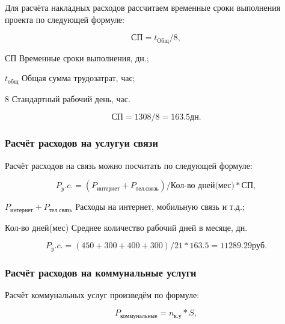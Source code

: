 Для расчёта накладных расходов рассчитаем временные сроки выполнения проекта по следующей
формуле:

\begin{equation}
    \text{СП} = t_\text{Общ} / 8,
\end{equation}

\begin{eqexpl}[25mm]
    \item{СП} Временные сроки выполнения, дн.;
    \item{$t_\text{общ}$} Общая сумма трудозатрат, час;
    \item{8} Стандартный рабочий день, час.
\end{eqexpl}

\begin{equation*}
    \text{СП} = 1308 / 8 = 163.5 дн.
\end{equation*}

\subsubsection{Расчёт расходов на услугуи связи}

Расчёт расходов на связь можно посчитать по следующей формуле:

\begin{equation}
    P_y.c. = (P_\text{интернет} + P_\text{тел.связь}) / \text{Кол-во дней(мес)} * \text{СП},
\end{equation}

\begin{eqexpl}[57mm]
    \item{$P_\text{интернет} + P_\text{тел.связь}$} Расходы на интернет, мобильную связь и т.д.;
    \item{Кол-во дней(мес)} Среднее количество рабочий дней в месяце, дн.
\end{eqexpl}

\begin{equation*}
    P_y.c. = (450 + 300 + 400 + 300) / 21 * 163.5 = 11289.29 руб.
\end{equation*}

\subsubsection{Расчёт расходов на коммунальные услуги}

Расчёт коммунальных услуг произведём по формуле:

\begin{equation}
    P_\text{коммунальные} = n_\text{к.у} * S,
\end{equation}

